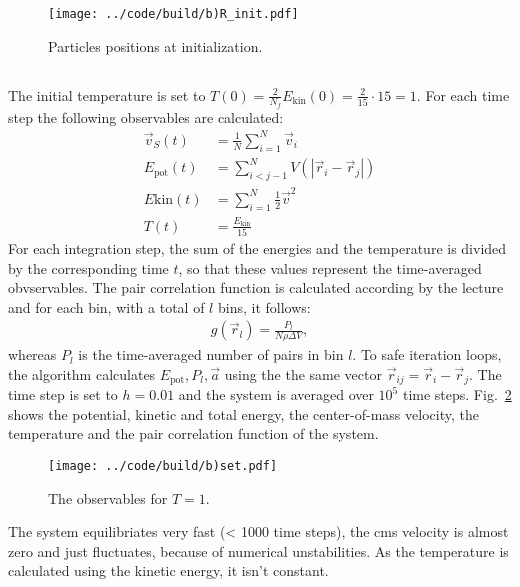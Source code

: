 \begin{figure}[h]
    \centering
    \texttt{[image: ../code/build/b)R\_init.pdf]}
    \caption{Particles positions at initialization.}
    \label{fig:b_1}
\end{figure}

\subsection{}
The initial temperature is set to $T(0) = \frac{2}{N_f} E_{\text{kin}}(0) = \frac{2}{15} \cdot 15 = 1$. For each time step the following observables are calculated:
\begin{align}
    \vec{v}_S(t) &= \frac{1}{N} \sum_{i=1}^N \vec{v}_i \\
    E_{\text{pot}}(t) &= \sum_{i<j-1}^N V\left( | \vec{r}_i - \vec{r}_j |  \right) \\
    E{\text{kin}}(t) &= \sum_{i=1}^N \frac{1}{2} \vec{v}^2 \\
    T(t) &= \frac{E_{\text{kin}}}{15}
\end{align}
For each integration step, the sum of the energies and the temperature is divided by the corresponding time $t$, so that these values represent the time-averaged obvservables. The pair correlation function is calculated according by the lecture and for each bin, with a total of $l$ bins, it follows:
\begin{align}
    g(\vec{r}_l) = \frac{P_l}{N \rho \Delta V},
\end{align}
whereas $P_l$ is the time-averaged number of pairs in bin $l$. To safe iteration loops, the algorithm calculates $E_{\text{pot}}, P_l, \vec{a}$ using the the same vector $\vec{r}_{ij} = \vec{r}_i - \vec{r}_j$. The time step is set to $h = 0.01$ and the system is averaged over $10^5$ time steps. Fig.~\ref{fig:b_2}  shows the potential, kinetic and total energy, the center-of-mass velocity, the temperature and the pair correlation function of the system.

\begin{figure}[h]
    \centering
    \texttt{[image: ../code/build/b)set.pdf]}
    \caption{The observables for $T=1$.}
    \label{fig:b_2}
\end{figure}

\noindent The system equilibriates very fast (< 1000 time steps), the cms velocity is almost zero and just fluctuates, because of numerical unstabilities. As the temperature is calculated using the kinetic energy, it isn't constant. 

